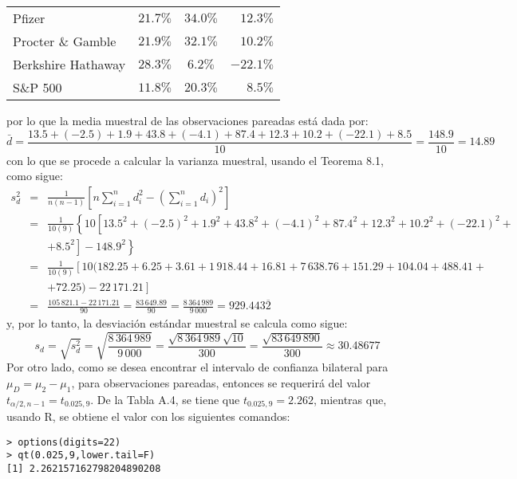 \begin{solucion}
\begin{center}
\begin{tabular}{lccr}
   Pfizer & $21.7\%$ & $34.0\%$ & $12.3\%$ \\
   Procter \& Gamble & $21.9\%$ & $32.1\%$ & $10.2\%$ \\
   Berkshire Hathaway & $28.3\%$ & $6.2\%$ & $-22.1\%$ \\
   S\&P 500 & $11.8\%$ & $20.3\%$ & $8.5\%$
  \end{tabular}
 \end{center}
 por lo que la media muestral de las observaciones pareadas est\'a dada por:
 \begin{equation*}
  \bar{d} = \frac{13.5 + (-2.5) + 1.9 + 43.8 + (-4.1) + 87.4 + 12.3 + 10.2 + (-22.1) + 8.5}{10} = \frac{148.9}{10} = 14.89
 \end{equation*}
 con lo que se procede a calcular la varianza muestral, usando el Teorema 8.1, como sigue:
 \begin{eqnarray*}
  s_d^2 & = & \frac{1}{n(n-1)} \left[ n \sum_{i=1}^n d_i^2 - \left( \sum_{i=1}^n d_i \right)^2 \right] \\
  & = & \frac{1}{10(9)} \left\{ 10\left[ 13.5^2 + (-2.5)^2 + 1.9^2 + 43.8^2 + (-4.1)^2 + 87.4^2 + 12.3^2 + 10.2^2 + (-22.1)^2 + \right. \right. \\
  & & \left. \left. + 8.5^2 \right] - 148.9^2 \right\} \\
  & = & \frac{1}{10(9)} \left[ 10(182.25 + 6.25 + 3.61 + 1\,918.44 + 16.81 + 7\,638.76 + 151.29 + 104.04 + 488.41 + \right. \\
  & & \left. + 72.25) - 22\,171.21\right] \\
  & = & \frac{105\,821.1 - 22\,171.21}{90} = \frac{83\,649.89}{90} = \frac{8\,364\,989}{9\,000} = 929.443\overline{2}
 \end{eqnarray*}
 y, por lo tanto, la desviaci\'on est\'andar muestral se calcula como sigue:
 \begin{equation*}
  s_d = \sqrt{s_d^2} = \sqrt{\frac{8\,364\,989}{9\,000}} = \frac{\sqrt{8\,364\,989}\sqrt{10}}{300} = \frac{\sqrt{83\,649\,890}}{300} \approx 30.48677
 \end{equation*}
 Por otro lado, como se desea encontrar el intervalo de confianza bilateral para $\mu_D = \mu_2 - \mu_1$, para observaciones pareadas, entonces se requerir\'a del valor $t_{\alpha/2,n-1} = t_{0.025,9}$. De la Tabla A.4, se tiene que $t_{0.025,9} = 2.262$, mientras que, usando R, se obtiene el valor con los siguientes comandos:
 \begin{verbatim}
> options(digits=22)
> qt(0.025,9,lower.tail=F)
[1] 2.262157162798204890208
 \end{verbatim}

\end{solucion}
